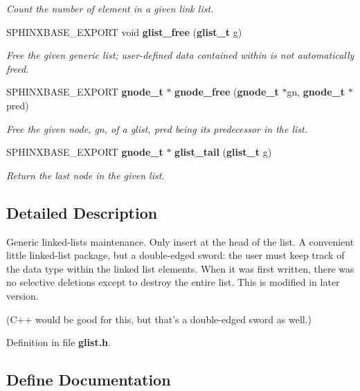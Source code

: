 \begin{DoxyCompactItemize}
\begin{DoxyCompactList}\small\item\em \-Count the number of element in a given link list. \end{DoxyCompactList}\item 
\-S\-P\-H\-I\-N\-X\-B\-A\-S\-E\-\_\-\-E\-X\-P\-O\-R\-T void {\bf glist\-\_\-free} ({\bf glist\-\_\-t} g)
\begin{DoxyCompactList}\small\item\em \-Free the given generic list; user-\/defined data contained within is not automatically freed. \end{DoxyCompactList}\item 
\-S\-P\-H\-I\-N\-X\-B\-A\-S\-E\-\_\-\-E\-X\-P\-O\-R\-T {\bf gnode\-\_\-t} $\ast$ {\bf gnode\-\_\-free} ({\bf gnode\-\_\-t} $\ast$gn, {\bf gnode\-\_\-t} $\ast$pred)
\begin{DoxyCompactList}\small\item\em \-Free the given node, gn, of a glist, pred being its predecessor in the list. \end{DoxyCompactList}\item 
\-S\-P\-H\-I\-N\-X\-B\-A\-S\-E\-\_\-\-E\-X\-P\-O\-R\-T {\bf gnode\-\_\-t} $\ast$ {\bf glist\-\_\-tail} ({\bf glist\-\_\-t} g)\label{glist_8h_a6921d6b8b11cb9e05fadeaa091e89234}

\begin{DoxyCompactList}\small\item\em \-Return the last node in the given list. \end{DoxyCompactList}\end{DoxyCompactItemize}


\subsection{\-Detailed \-Description}
\-Generic linked-\/lists maintenance. \-Only insert at the head of the list. \-A convenient little linked-\/list package, but a double-\/edged sword\-: the user must keep track of the data type within the linked list elements. \-When it was first written, there was no selective deletions except to destroy the entire list. \-This is modified in later version.

(\-C++ would be good for this, but that's a double-\/edged sword as well.) 

\-Definition in file {\bf glist.\-h}.



\subsection{\-Define \-Documentation}
